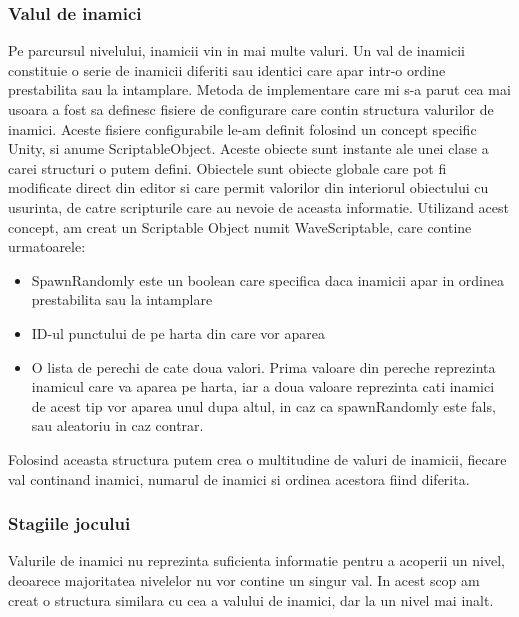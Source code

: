 \documentclass[12pt, a4paper]{article}
\begin{document}
	
	
	
	
	\subsubsection{Valul de inamici}
	
	Pe parcursul nivelului, inamicii vin in mai multe valuri. Un val de inamicii constituie o serie de inamicii diferiti sau identici care apar intr-o ordine prestabilita sau la intamplare. Metoda de implementare care mi s-a parut cea mai usoara a fost sa definesc fisiere de configurare care contin structura valurilor de inamici. Aceste fisiere configurabile le-am definit folosind un concept specific Unity, si anume ScriptableObject. Aceste obiecte sunt instante ale unei clase a carei structuri o putem defini. Obiectele sunt obiecte globale care pot fi modificate direct din editor si care permit valorilor din interiorul obiectului cu usurinta, de catre scripturile care au nevoie de aceasta informatie. Utilizand acest concept, am creat un Scriptable Object numit WaveScriptable, care contine urmatoarele:
	
	\begin{itemize}
		\item SpawnRandomly este un boolean care specifica daca inamicii apar in ordinea prestabilita sau la intamplare
		\item ID-ul punctului de pe harta din care vor aparea
		\item O lista de perechi de cate doua valori. Prima valoare din pereche reprezinta inamicul care va aparea pe harta, iar a doua valoare reprezinta cati inamici de acest tip vor aparea unul dupa altul, in caz ca spawnRandomly este fals, sau aleatoriu in caz contrar.
	\end{itemize}

	Folosind aceasta structura putem crea o multitudine de valuri de inamicii, fiecare val continand inamici, numarul de inamici si ordinea acestora fiind diferita.
	
	
	
	
	
	\subsubsection{Stagiile jocului}
	
	Valurile de inamici nu reprezinta suficienta informatie pentru a acoperii un nivel, deoarece majoritatea nivelelor nu vor contine un singur val. In acest scop am creat o structura similara cu cea a valului de inamici, dar la un nivel mai inalt.
	\newline
	
\end{document}
